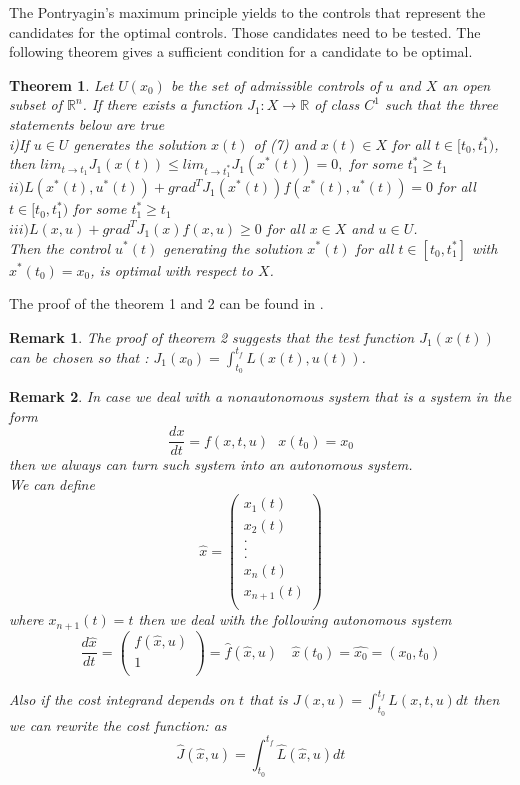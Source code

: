 \documentclass[12pt]{article}
\newtheorem{theorem}{Theorem}
\newtheorem{remark}{Remark}
\begin{document}
The Pontryagin's maximum principle yields to the controls that represent
the candidates for the optimal controls. Those candidates need to be tested. The following theorem gives a sufficient condition for a candidate to be optimal.
\begin{theorem}
Let $U(x_0)$ be the set of admissible controls of $u$ and $X$ an open  subset of $ {\mathbb R}^{n}$.
If there exists a function $J_1:X\rightarrow  {\mathbb R}$ of class $C^1$
such that the three statements below are true\\
i)If $u\in U$ generates the solution $x(t)$ of (7) and $x(t)\in X$ for all $t\in [t_0,t_1^*)$, then $lim_{t\rightarrow t_1}J_1(x(t))\leq lim_{t\rightarrow t_1^*}J_1(x^*(t))=0, $
for some   $t_1^*\geq t_1$\\
$ii)L(x^{*}(t),u^{*}(t))+grad^{T}J_1(x^*(t))f(x^{*}(t),u^{*}(t))=0$ for
all $t\in [t_0,t_1^*)$ for some   $t_1^*\geq t_1$\\
$iii)L(x,u)+grad^TJ_1(x)f(x,u)\geq 0$ for all $x\in X$ and $u\in U$.\\
Then  the control $u^*(t)$ generating the solution $x^*(t)$  for all $t\in [t_0,t_1^*]$ with $x^*(t_0)=x_0$, is optimal with respect to $X$.
\end{theorem}
The proof of the theorem 1 and 2 can be found in \cite{Leitman}.\\
\begin{remark}The proof of theorem 2  suggests that the test function $J_1(x(t))$ can be chosen so that : $J_1(x_0)=\int_{t_0}^{t_f} L(x(t),u(t))$.
\end{remark}
\begin{remark} 
In case we deal with a nonautonomous system that is  a system in the
form $$\frac{dx}{dt}=f(x,t,u)\, \,  \, \,  x(t_0)=x_0$$ 
then we always can turn such system into an autonomous system.\\
We can define\\
$$\hat{x}=\left(\begin{array}{c}
x_1(t)       \\
x_2(t) \\
   .\\
   .\\
    .\\   
    x_n(t)\\
    x_{n+1}(t)\\
\end{array}\right)$$
where $x_{n+1}(t)=t$ then we deal with the following autonomous system  $$\frac{d\hat{x}}{dt}=\left(\begin{array}{c}
  f(\hat{x},u)   \\
1\\   
\end{array}\right)
=
\hat{f}(\hat{x},u)\, \,  \, \, \, \, \hat{x}(t_0)=\hat{x_0}=(x_0,t_0)$$


Also if  the  cost integrand  depends on $t$ that is $J(x,u)=\int_{t_0}^{t_f}L(x,t,u)dt$  then we can rewrite the cost function:
as  $$\hat{J}(\hat{x},u)=\int_{t_0}^{t_f}\hat{L}(\hat{x},u)dt$$


\end{remark}
\end{document}
